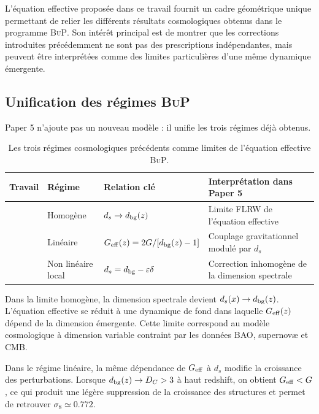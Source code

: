 \documentclass[11pt]{article}
\newcommand{\DC}{D_C}
\newcommand{\Geff}{G_{\rm eff}}
\newcommand{\sig}{\sigma_8}
\newcommand{\BuP}{\textsc{BuP}}
\begin{document}
L'\'equation effective propos\'ee dans ce travail fournit un cadre g\'eom\'etrique unique
permettant de relier les diff\'erents r\'esultats cosmologiques obtenus dans le
programme \BuP. Son int\'er\^et principal est de montrer que les corrections introduites
pr\'ec\'edemment ne sont pas des prescriptions ind\'ependantes, mais peuvent \^etre
interpr\'et\'ees comme des limites particulières d'une m\^eme dynamique \'emergente.

\subsection{Unification des r\'egimes \BuP}

Paper 5 n'ajoute pas un nouveau mod\`ele : il unifie les trois r\'egimes d\'ej\`a obtenus.

\begin{table}[htbp]
\centering
\caption{Les trois r\'egimes cosmologiques pr\'ec\'edents comme limites de l'\'equation
effective \BuP.}
\label{tab:unification}
\smallskip
\begin{tabular}{p{2.4cm}p{2.5cm}p{3.4cm}p{4.6cm}}
\toprule
Travail & R\'egime & Relation cl\'e & Interpr\'etation dans Paper 5 \\
\midrule
\cite{hamdad2026bup} &
Homog\`ene &
$d_s\rightarrow d_{\rm bg}(z)$ &
Limite FLRW de l'\'equation effective \\[4pt]
\cite{hamdad2026p3} &
Lin\'eaire &
$\Geff(z)=2G/[d_{\rm bg}(z)-1]$ &
Couplage gravitationnel modul\'e par $d_s$ \\[4pt]
\cite{hamdad2026p4} &
Non lin\'eaire local &
$d_s=d_{\rm bg}-\varepsilon\delta$ &
Correction inhomog\`ene de la dimension spectrale \\
\bottomrule
\end{tabular}
\end{table}

Dans la limite homog\`ene, la dimension spectrale devient $d_s(x)\rightarrow d_{\rm bg}(z)$.
L'\'equation effective se r\'eduit \`a une dynamique de fond dans laquelle $\Geff(z)$
d\'epend de la dimension \'emergente. Cette limite correspond au mod\`ele cosmologique
\`a dimension variable contraint par les donn\'ees BAO, supernovæ et CMB.

Dans le r\'egime lin\'eaire, la m\^eme d\'ependance de $\Geff$ \`a $d_s$ modifie la
croissance des perturbations. Lorsque $d_{\rm bg}(z)\rightarrow\DC>3$ \`a haut redshift,
on obtient $\Geff<G$, ce qui produit une l\'eg\`ere suppression de la croissance des
structures et permet de retrouver $\sig\simeq0.772$.
\end{document}
